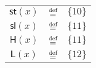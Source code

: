 \begin{figure}[ht]
\begin{tabular}{ccl}
		   ${\mathsf{st}}(x)$     &          $\stackrel{\text{def}}{=}$          & $\{10\}$                                                                                                                          \\
		   ${\mathsf{sl}}(x)$     &          $\stackrel{\text{def}}{=}$          & $\{11\}$                                                                                                                          \\
		    ${\mathsf{H}}(x)$     &          $\stackrel{\text{def}}{=}$          & $\{11\}$                                                                                                                          \\
		    ${\mathsf{L}}(x)$     &          $\stackrel{\text{def}}{=}$          & $\{12\}$                                                                                                                          \\ \hline
	\end{tabular}
\end{figure}

